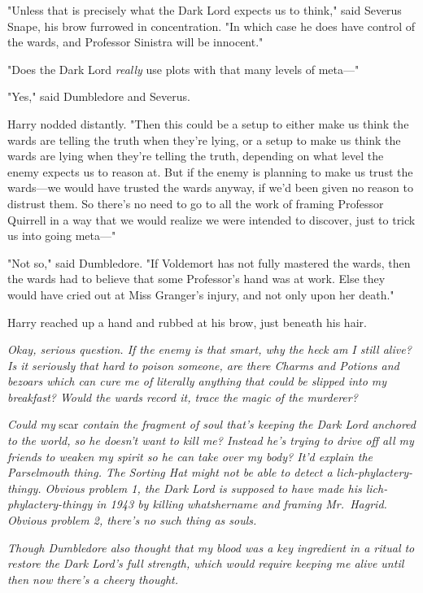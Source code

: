"Unless that is precisely what the Dark Lord expects us to think," said Severus
Snape, his brow furrowed in concentration. "In which case he does have control
of the wards, and Professor Sinistra will be innocent."

"Does the Dark Lord \emph{really} use plots with that many levels of meta---"

"Yes," said Dumbledore and Severus.

Harry nodded distantly. "Then this could be a setup to either make us think the
wards are telling the truth when they're lying, or a setup to make us think the
wards are lying when they're telling the truth, depending on what level the
enemy expects us to reason at. But if the enemy is planning to make us trust
the wards---we would have trusted the wards anyway, if we'd been given no
reason to distrust them. So there's no need to go to all the work of framing
Professor Quirrell in a way that we would realize we were intended to discover,
just to trick us into going meta---"

"Not so," said Dumbledore. "If Voldemort has not fully mastered the wards, then
the wards had to believe that some Professor's hand was at work. Else they
would have cried out at Miss Granger's injury, and not only upon her death."

Harry reached up a hand and rubbed at his brow, just beneath his hair.

\emph{Okay, serious question. If the enemy is that smart, why the heck am I
still alive? Is it seriously that hard to poison someone, are there Charms and
Potions and bezoars which can cure me of literally anything that could be
slipped into my breakfast? Would the wards record it, trace the magic of the
murderer?}

\emph{Could my} scar \emph{contain the fragment of soul that's keeping the Dark
Lord anchored to the world, so he doesn't want to kill me? Instead he's trying
to drive off all my friends to weaken my spirit so he can take over my body?
It'd explain the Parselmouth thing. The Sorting Hat might not be able to detect
a lich-phylactery-thingy. Obvious problem 1, the Dark Lord is supposed to have
made his lich-phylactery-thingy in 1943 by killing whatshername and framing
Mr.~Hagrid. Obvious problem 2, there's no such thing as souls.}

\emph{Though Dumbledore also thought that my blood was a key ingredient in a
ritual to restore the Dark Lord's full strength, which would require keeping me
alive until then{\el} now there's a cheery thought.}

